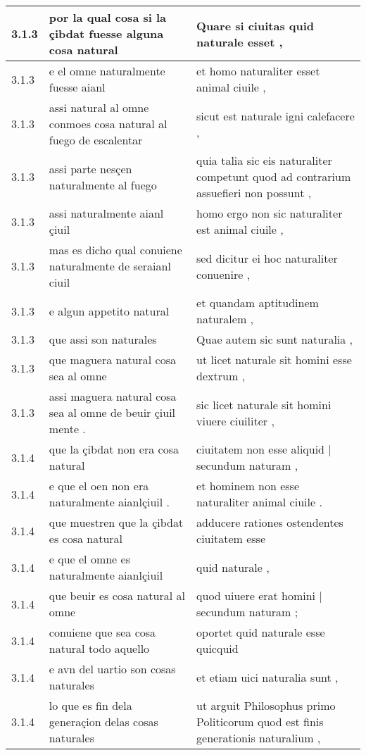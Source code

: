 \begin{tabular}{|p{1cm}|p{6.5cm}|p{6.5cm}|}
3.1.3 & por la qual cosa si la çibdat fuesse alguna cosa natural & Quare si ciuitas quid naturale esset , \\\hline
3.1.3 & e el omne naturalmente fuesse aianl & et homo naturaliter esset animal ciuile , \\\hline
3.1.3 & assi natural al omne conmoes cosa natural al fuego de escalentar & sicut est naturale igni calefacere , \\\hline
3.1.3 & assi parte nesçen naturalmente al fuego & quia talia sic eis naturaliter competunt quod ad contrarium assuefieri non possunt , \\\hline
3.1.3 & assi naturalmente aianl çiuil & homo ergo non sic naturaliter est animal ciuile , \\\hline
3.1.3 & mas es dicho qual conuiene naturalmente de seraianl ciuil & sed dicitur ei hoc naturaliter conuenire , \\\hline
3.1.3 & e algun appetito natural & et quandam aptitudinem naturalem , \\\hline
3.1.3 & que assi son naturales & Quae autem sic sunt naturalia , \\\hline
3.1.3 & que maguera natural cosa sea al omne & ut licet naturale sit homini esse dextrum , \\\hline
3.1.3 & assi maguera natural cosa sea al omne de beuir çiuil mente . & sic licet naturale sit homini viuere ciuiliter , \\\hline
3.1.4 & que la çibdat non era cosa natural & ciuitatem non esse aliquid | secundum naturam , \\\hline
3.1.4 & e que el oen non era naturalmente aianlçiuil . & et hominem non esse naturaliter animal ciuile . \\\hline
3.1.4 & que muestren que la çibdat es cosa natural & adducere rationes ostendentes ciuitatem esse \\\hline
3.1.4 & e que el omne es naturalmente aianlçiuil & quid naturale , \\\hline
3.1.4 & que beuir es cosa natural al omne & quod uiuere erat homini | secundum naturam ; \\\hline
3.1.4 & conuiene que sea cosa natural todo aquello & oportet quid naturale esse quicquid \\\hline
3.1.4 & e avn del uartio son cosas naturales & et etiam uici naturalia sunt , \\\hline
3.1.4 & lo que es fin dela generaçion delas cosas naturales & ut arguit Philosophus primo Politicorum quod est finis generationis naturalium , \\\hline

\end{tabular}
